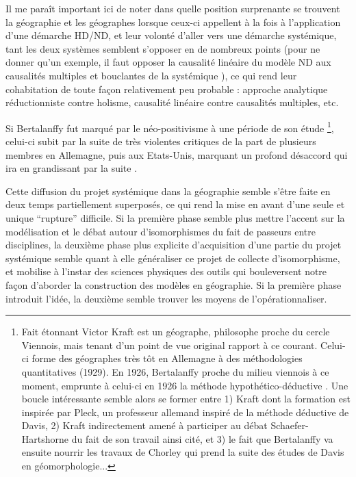 Il me paraît important ici de noter dans quelle position surprenante se trouvent la géographie et les géographes lorsque ceux-ci appellent à la fois à l'application d'une démarche HD/ND, et leur volonté d'aller vers une démarche systémique, tant les deux systèmes semblent s'opposer en de nombreux points (pour ne donner qu'un exemple, il faut opposer la causalité linéaire du modèle ND aux causalités multiples et bouclantes de la systémique \autocite{Besse2000}), ce qui rend leur cohabitation de toute façon relativement peu probable : approche analytique réductionniste contre holisme, causalité linéaire contre causalités multiples, etc.

Si Bertalanffy fut marqué par le néo-positivisme à une période de son étude \footnote{Fait étonnant Victor Kraft est un géographe, philosophe proche du cercle Viennois, mais tenant d'un point de vue original rapport à ce courant. Celui-ci forme des géographes très tôt en Allemagne à des méthodologies quantitatives (1929). En 1926, Bertalanffy proche du milieu viennois à ce moment, emprunte à celui-ci en 1926 la méthode hypothético-déductive \autocite[342]{Pouvreau2013}. Une boucle intéressante semble alors se former entre 1) Kraft dont la formation est inspirée par Pleck, un professeur allemand inspiré de la méthode déductive de Davis, 2) Kraft indirectement amené à participer au débat Schaefer-Hartshorne du fait de son travail ainsi cité, et 3) le fait que Bertalanffy va ensuite nourrir les travaux de Chorley qui prend la suite des études de Davis en géomorphologie...}, celui-ci subit par la suite de très violentes critiques de la part de plusieurs membres en Allemagne, puis aux Etats-Unis, marquant un profond désaccord qui ira en grandissant par la suite \autocite[26-27]{Pouvreau2006}.

Cette diffusion du projet systémique dans la géographie semble s'être faite en deux temps partiellement superposés, ce qui rend la mise en avant d'une seule et unique \enquote{rupture} difficile. Si la première phase semble plus mettre l'accent sur la modélisation et le débat autour d'isomorphismes du fait de passeurs entre disciplines, la deuxième phase plus explicite d'acquisition d'une partie du projet systémique semble quant à elle généraliser ce projet de collecte d'isomorphisme, et mobilise à l'instar des sciences physiques des outils qui bouleversent notre façon d'aborder la construction des modèles en géographie. Si la première phase introduit l'idée, la deuxième semble trouver les moyens de l’opérationnaliser.


